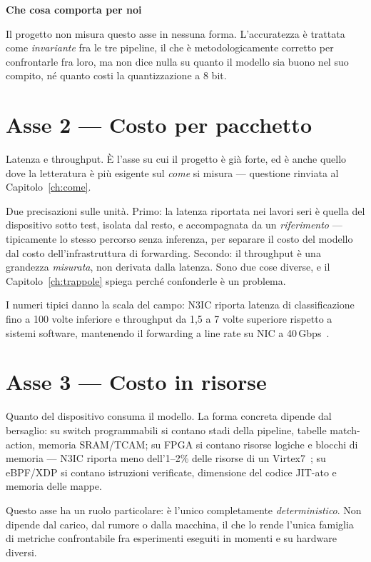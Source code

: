 \documentclass[11pt,a4paper,oneside]{report}
\newcommand{\verdetto}[2]{%
  \par\vspace{4pt}%
  \noindent\colorbox{boxbg}{%
    \begin{minipage}{\dimexpr\linewidth-2\fboxsep}%
      \vspace{3pt}\textbf{\color{accent}#1}\par\vspace{2pt}#2\vspace{3pt}%
    \end{minipage}}%
  \par\vspace{6pt}}
\begin{document}
\verdetto{Che cosa comporta per noi}{Il progetto non misura questo asse
in nessuna forma. L'accuratezza è trattata come \emph{invariante} fra
le tre pipeline, il che è metodologicamente corretto per confrontarle
fra loro, ma non dice nulla su quanto il modello sia buono nel suo
compito, né quanto costi la quantizzazione a 8 bit.}

\section{Asse 2 --- Costo per pacchetto}

Latenza e throughput. È l'asse su cui il progetto è già forte, ed è
anche quello dove la letteratura è più esigente sul \emph{come} si
misura --- questione rinviata al Capitolo~\ref{ch:come}.

Due precisazioni sulle unità. Primo: la latenza riportata nei lavori
seri è quella del dispositivo sotto test, isolata dal resto, e
accompagnata da un \emph{riferimento} --- tipicamente lo stesso
percorso senza inferenza, per separare il costo del modello dal costo
dell'infrastruttura di forwarding. Secondo: il throughput è una
grandezza \emph{misurata}, non derivata dalla latenza. Sono due cose
diverse, e il Capitolo~\ref{ch:trappole} spiega perché confonderle è
un problema.

I numeri tipici danno la scala del campo: N3IC riporta latenza di
classificazione fino a 100 volte inferiore e throughput da 1,5 a 7
volte superiore rispetto a sistemi software, mantenendo il forwarding
a line rate su NIC a 40\,Gbps~\cite{siracusano22n3ic}.

\section{Asse 3 --- Costo in risorse}

Quanto del dispositivo consuma il modello. La forma concreta dipende
dal bersaglio: su switch programmabili si contano stadi della
pipeline, tabelle match-action, memoria SRAM/TCAM; su FPGA si contano
risorse logiche e blocchi di memoria --- N3IC riporta meno dell'1--2\%
delle risorse di un Virtex7~\cite{siracusano22n3ic}; su eBPF/XDP si
contano istruzioni verificate, dimensione del codice JIT-ato e memoria
delle mappe.

Questo asse ha un ruolo particolare: è l'unico completamente
\emph{deterministico}. Non dipende dal carico, dal rumore o dalla
macchina, il che lo rende l'unica famiglia di metriche confrontabile
fra esperimenti eseguiti in momenti e su hardware diversi.
\end{document}
